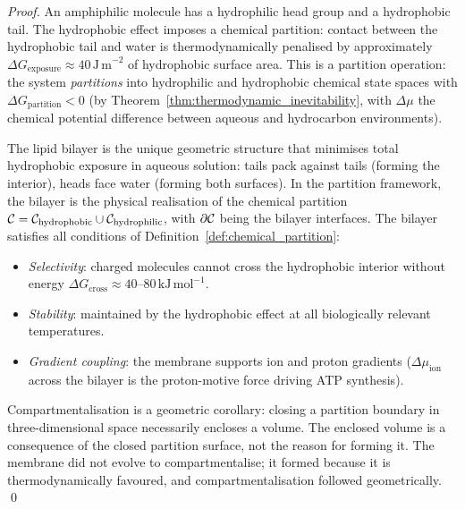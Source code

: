\begin{proof}
An amphiphilic molecule has a hydrophilic head group and a hydrophobic tail.
The hydrophobic effect imposes a chemical partition: contact between the
hydrophobic tail and water is thermodynamically penalised by approximately
$\Delta G_{\mathrm{exposure}} \approx 40\,\mathrm{J\,m}^{-2}$ of hydrophobic
surface area. This is a partition operation: the system \emph{partitions} into
hydrophilic and hydrophobic chemical state spaces with $\Delta G_{\mathrm{partition}} < 0$
(by Theorem~\ref{thm:thermodynamic_inevitability}, with $\Delta\mu$ the chemical
potential difference between aqueous and hydrocarbon environments).

The lipid bilayer is the unique geometric structure that minimises total
hydrophobic exposure in aqueous solution: tails pack against tails (forming
the interior), heads face water (forming both surfaces). In the partition
framework, the bilayer is the physical realisation of the chemical partition
$\mathcal{C} = \mathcal{C}_{\mathrm{hydrophobic}} \cup \mathcal{C}_{\mathrm{hydrophilic}}$, with
$\partial\mathcal{C}$ being the bilayer interfaces. The bilayer satisfies all conditions
of Definition~\ref{def:chemical_partition}:
\begin{itemize}
  \item \textit{Selectivity}: charged molecules cannot cross the hydrophobic
        interior without energy $\Delta G_{\mathrm{cross}} \approx 40$--$80\,\mathrm{kJ\,mol}^{-1}$.
  \item \textit{Stability}: maintained by the hydrophobic effect at all
        biologically relevant temperatures.
  \item \textit{Gradient coupling}: the membrane supports ion and proton
        gradients ($\Delta\mu_{\mathrm{ion}}$ across the bilayer is the
        proton-motive force driving ATP synthesis).
\end{itemize}

Compartmentalisation is a geometric corollary: closing a partition boundary
in three-dimensional space necessarily encloses a volume. The enclosed volume
is a consequence of the closed partition surface, not the reason for forming it.
The membrane did not evolve to compartmentalise; it formed because it is
thermodynamically favoured, and compartmentalisation followed geometrically.
\qed
\end{proof}

